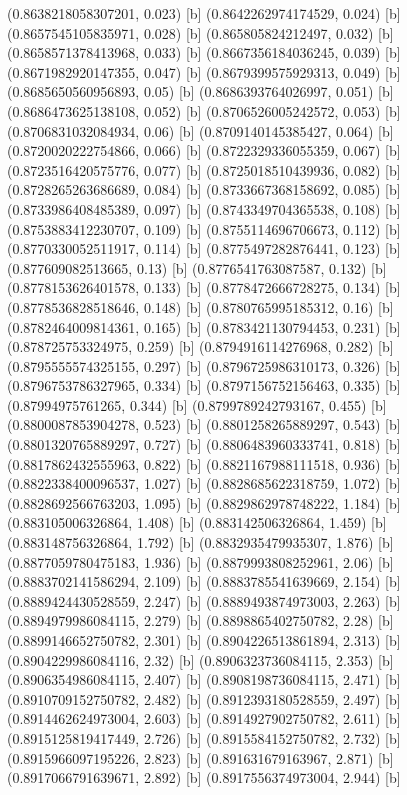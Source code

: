 {{{(0.8638218058307201, 0.023) [b] 
(0.8642262974174529, 0.024) [b] 
(0.8657545105835971, 0.028) [b] 
(0.865805824212497, 0.032) [b] 
(0.8658571378413968, 0.033) [b] 
(0.8667356184036245, 0.039) [b] 
(0.8671982920147355, 0.047) [b] 
(0.8679399575929313, 0.049) [b] 
(0.8685650560956893, 0.05) [b] 
(0.8686393764026997, 0.051) [b] 
(0.8686473625138108, 0.052) [b] 
(0.8706526005242572, 0.053) [b] 
(0.8706831032084934, 0.06) [b] 
(0.8709140145385427, 0.064) [b] 
(0.8720020222754866, 0.066) [b] 
(0.8722329336055359, 0.067) [b] 
(0.8723516420575776, 0.077) [b] 
(0.8725018510439936, 0.082) [b] 
(0.8728265263686689, 0.084) [b] 
(0.8733667368158692, 0.085) [b] 
(0.8733986408485389, 0.097) [b] 
(0.8743349704365538, 0.108) [b] 
(0.8753883412230707, 0.109) [b] 
(0.8755114696706673, 0.112) [b] 
(0.8770330052511917, 0.114) [b] 
(0.8775497282876441, 0.123) [b] 
(0.877609082513665, 0.13) [b] 
(0.8776541763087587, 0.132) [b] 
(0.8778153626401578, 0.133) [b] 
(0.8778472666728275, 0.134) [b] 
(0.8778536828518646, 0.148) [b] 
(0.8780765995185312, 0.16) [b] 
(0.8782464009814361, 0.165) [b] 
(0.8783421130794453, 0.231) [b] 
(0.878725753324975, 0.259) [b] 
(0.8794916114276968, 0.282) [b] 
(0.8795555574325155, 0.297) [b] 
(0.8796725986310173, 0.326) [b] 
(0.8796753786327965, 0.334) [b] 
(0.8797156752156463, 0.335) [b] 
(0.87994975761265, 0.344) [b] 
(0.8799789242793167, 0.455) [b] 
(0.8800087853904278, 0.523) [b] 
(0.8801258265889297, 0.543) [b] 
(0.8801320765889297, 0.727) [b] 
(0.8806483960333741, 0.818) [b] 
(0.8817862432555963, 0.822) [b] 
(0.8821167988111518, 0.936) [b] 
(0.8822338400096537, 1.027) [b] 
(0.8828685622318759, 1.072) [b] 
(0.8828692566763203, 1.095) [b] 
(0.8829862978748222, 1.184) [b] 
(0.883105006326864, 1.408) [b] 
(0.883142506326864, 1.459) [b] 
(0.883148756326864, 1.792) [b] 
(0.8832935479935307, 1.876) [b] 
(0.8877059780475183, 1.936) [b] 
(0.8879993808252961, 2.06) [b] 
(0.8883702141586294, 2.109) [b] 
(0.8883785541639669, 2.154) [b] 
(0.8889424430528559, 2.247) [b] 
(0.8889493874973003, 2.263) [b] 
(0.8894979986084115, 2.279) [b] 
(0.8898865402750782, 2.28) [b] 
(0.8899146652750782, 2.301) [b] 
(0.8904226513861894, 2.313) [b] 
(0.8904229986084116, 2.32) [b] 
(0.8906323736084115, 2.353) [b] 
(0.8906354986084115, 2.407) [b] 
(0.8908198736084115, 2.471) [b] 
(0.8910709152750782, 2.482) [b] 
(0.8912393180528559, 2.497) [b] 
(0.8914462624973004, 2.603) [b] 
(0.8914927902750782, 2.611) [b] 
(0.8915125819417449, 2.726) [b] 
(0.8915584152750782, 2.732) [b] 
(0.8915966097195226, 2.823) [b] 
(0.891631679163967, 2.871) [b] 
(0.8917066791639671, 2.892) [b] 
(0.8917556374973004, 2.944) [b] 
}}}
